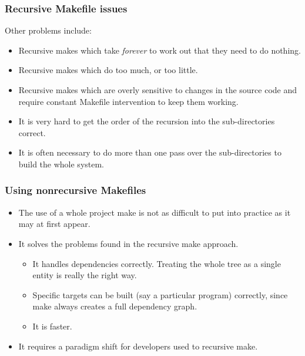 \documentclass[11pt]{beamer}
\begin{document}

\begin{frame}
  \frametitle{Recursive Makefile issues}
  Other problems include:

  \begin{itemize}
    \item Recursive makes which take \emph{forever} to work out that they need
      to do nothing.\\[2mm]
    \item Recursive makes which do too much, or too little.\\[2mm]
    \item Recursive makes which are overly sensitive to changes in the source
      code and require constant Makefile intervention to keep them
      working.\\[2mm]
    \item It is very hard to get the order of the recursion into the
      sub-directories correct.\\[2mm]
    \item It is often necessary to do more than one pass over the
      sub-directories to build the whole system.
  \end{itemize}
\end{frame}


\begin{frame}
  \frametitle{Using nonrecursive Makefiles}
  \begin{itemize}
    \item<1-> The use of a whole project make is not as difficult to put into
      practice as it may at first appear.\\[5mm]
    \item<2-> It solves the problems found in the recursive make approach.

      \begin{itemize}[<3->]
      \item It handles dependencies correctly. Treating the whole tree as a
        single entity is really the right way.\\[1mm]
      \item Specific targets can be built (say a particular program)
        correctly, since make always creates a full dependency graph.\\[1mm]
      \item It is faster.\\[5mm]
      \end{itemize}
    \item<4> It requires a paradigm shift for developers used to recursive
      make.
  \end{itemize}
\end{frame}
\end{document}

